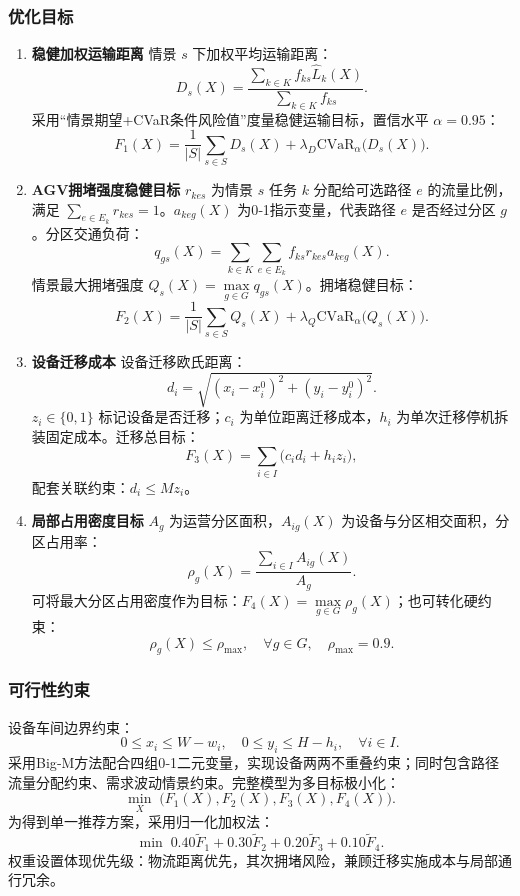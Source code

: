 \documentclass[12pt,a4paper]{article}
\begin{document}
\subsubsection{优化目标}
\begin{enumerate}
	\item \textbf{稳健加权运输距离}
	情景 $s$ 下加权平均运输距离：
	\[
	D_s(X)=\frac{\sum_{k\in K} f_{ks} \widehat L_k(X)}{\sum_{k\in K} f_{ks}}.
	\]
	采用“情景期望+CVaR条件风险值”度量稳健运输目标，置信水平 $\alpha=0.95$：
	\[
	F_1(X)=\frac{1}{|S|}\sum_{s\in S} D_s(X)+\lambda_D \text{CVaR}_\alpha\big(D_s(X)\big).
	\]
	
	\item \textbf{AGV拥堵强度稳健目标}
	$r_{kes}$ 为情景 $s$ 任务 $k$ 分配给可选路径 $e$ 的流量比例，满足 $\sum\limits_{e\in E_k} r_{kes}=1$。$a_{keg}(X)$ 为0‑1指示变量，代表路径 $e$ 是否经过分区 $g$。分区交通负荷：
	\[
	q_{gs}(X)=\sum_{k\in K}\sum_{e\in E_k} f_{ks} r_{kes} a_{keg}(X).
	\]
	情景最大拥堵强度 $Q_s(X)=\max\limits_{g\in G} q_{gs}(X)$。拥堵稳健目标：
	\[
	F_2(X)=\frac{1}{|S|}\sum_{s\in S} Q_s(X)+\lambda_Q \text{CVaR}_\alpha\big(Q_s(X)\big).
	\]
	
	\item \textbf{设备迁移成本}
	设备迁移欧氏距离：
	\[
	d_i=\sqrt{(x_i-x_i^0)^2+(y_i-y_i^0)^2}.
	\]
	$z_i\in\{0,1\}$ 标记设备是否迁移；$c_i$ 为单位距离迁移成本，$h_i$ 为单次迁移停机拆装固定成本。迁移总目标：
	\[
	F_3(X)=\sum_{i\in I}\big(c_i d_i+h_i z_i\big),
	\]
	配套关联约束：$d_i\le M z_i$。
	
	\item \textbf{局部占用密度目标}
	$A_g$ 为运营分区面积，$A_{ig}(X)$ 为设备与分区相交面积，分区占用率：
	\[
	\rho_g(X)=\frac{\sum_{i\in I} A_{ig}(X)}{A_g}.
	\]
	可将最大分区占用密度作为目标：$F_4(X)=\max\limits_{g\in G}\rho_g(X)$；也可转化硬约束：
	\[
	\rho_g(X)\le \rho_{\max},\quad \forall g\in G,\quad \rho_{\max}=0.9.
	\]
\end{enumerate}

\subsubsection{可行性约束}
设备车间边界约束：
\[
0\le x_i \le W-w_i,\quad 0\le y_i \le H-h_i,\quad \forall i\in I.
\]
采用Big‑M方法配合四组0‑1二元变量，实现设备两两不重叠约束；同时包含路径流量分配约束、需求波动情景约束。完整模型为多目标极小化：
\[
\min_{X}\; \big(F_1(X),F_2(X),F_3(X),F_4(X)\big).
\]
为得到单一推荐方案，采用归一化加权法：
\[
\min\; 0.40\widetilde{F}_1+0.30\widetilde{F}_2+0.20\widetilde{F}_3+0.10\widetilde{F}_4.
\]
权重设置体现优先级：物流距离优先，其次拥堵风险，兼顾迁移实施成本与局部通行冗余。
\end{document}
